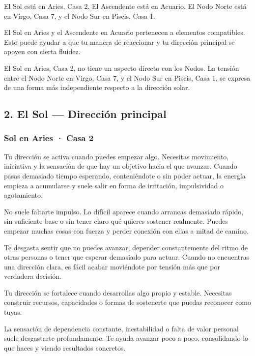 \documentclass[11pt,a4paper]{article}
\begin{document}
El Sol está en Aries, Casa 2. El Ascendente está en Acuario. El Nodo Norte está en Virgo, Casa 7, y el Nodo Sur en Piscis, Casa 1.

El Sol en Aries y el Ascendente en Acuario pertenecen a elementos compatibles. Esto puede ayudar a que tu manera de reaccionar y tu dirección principal se apoyen con cierta fluidez.

El Sol en Aries, Casa 2, no tiene un aspecto directo con los Nodos. La tensión entre el Nodo Norte en Virgo, Casa 7, y el Nodo Sur en Piscis, Casa 1, se expresa de una forma más independiente respecto a la dirección solar.

\vspace{0.5cm}


\subsection{2. El Sol — Dirección principal}

\subsubsection*{Sol en Aries · Casa 2}

Tu dirección se activa cuando puedes empezar algo. Necesitas movimiento, iniciativa y la sensación de que hay un objetivo hacia el que avanzar. Cuando pasas demasiado tiempo esperando, conteniéndote o sin poder actuar, la energía empieza a acumularse y suele salir en forma de irritación, impulsividad o agotamiento.

No suele faltarte impulso. Lo difícil aparece cuando arrancas demasiado rápido, sin suficiente base o sin tener claro qué quieres sostener realmente. Puedes empezar muchas cosas con fuerza y perder conexión con ellas a mitad de camino.

Te desgasta sentir que no puedes avanzar, depender constantemente del ritmo de otras personas o tener que esperar demasiado para actuar. Cuando no encuentras una dirección clara, es fácil acabar moviéndote por tensión más que por verdadera decisión.

Tu dirección se fortalece cuando desarrollas algo propio y estable. Necesitas construir recursos, capacidades o formas de sostenerte que puedas reconocer como tuyas.

La sensación de dependencia constante, inestabilidad o falta de valor personal suele desgastarte profundamente. Te ayuda avanzar poco a poco, consolidando lo que haces y viendo resultados concretos.
\end{document}
